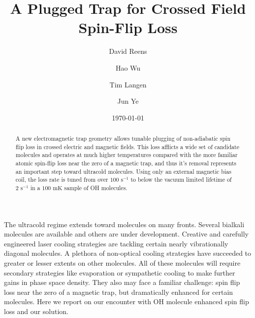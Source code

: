 \documentclass[%
 reprint,
 amsmath,amssymb,
 aps,
prl,
]{revtex4-1}
\begin{document}

\title{A Plugged Trap for Crossed Field Spin-Flip Loss}%


\author{David Reens}%
\author{Hao Wu}
\author{Tim Langen}%
\author{Jun Ye}
%

\date{\today}%


\begin{abstract}
A new electromagnetic trap geometry allows tunable plugging of non-adiabatic spin flip loss in crossed electric and magnetic fields. This loss afflicts a wide set of candidate molecules and operates at much higher temperatures compared with the more familiar atomic spin-flip loss near the zero of a magnetic trap, and thus it's removal represents an important step toward ultracold molecules. Using only an external magnetic bias coil, the loss rate is tuned from over $100 \text{ s}^{-1} $ to below the vacuum limited lifetime of $2 \text{ s}^{-1}$ in a $100 \text{ mK}$ sample of OH molecules.
\end{abstract}


\maketitle


%
%
The ultracold regime extends toward molecules on many fronts. Several bialkali molecules are available and others are under development. Creative and carefully engineered laser cooling strategies are tackling certain nearly vibrationally diagonal molecules. A plethora of non-optical cooling strategies have succeeded to greater or lesser extents on other molecules. All of these molecules will require secondary strategies like evaporation or sympathetic cooling to make further gains in phase space density. They also may face a familiar challenge: spin flip loss near the zero of a magnetic trap, but dramatically enhanced for certain molecules. Here we report on our encounter with OH molecule enhanced spin flip loss and our solution.
\end{document}
